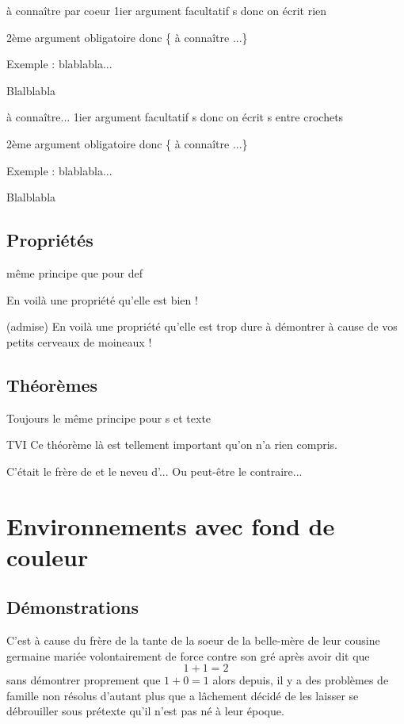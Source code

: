 \documentclass[french,10pt]{book}
\begin{document}
\begin{Defi} {à connaître par coeur}
1ier argument facultatif s donc on écrit rien \par
2ème argument obligatoire donc \{  à connaître ...\}
\end{Defi}

Exemple : blablabla...\par Blalblabla

\begin{Defi}[s]{à connaître...}
1ier argument facultatif s donc on écrit s entre crochets \par
2ème argument obligatoire donc \{  à connaître ...\}
\end{Defi}
Exemple : blablabla...\par Blalblabla

\subsection{Propriétés}

même principe que pour def \par 
\begin{Prop}[s] {}
    En voilà une propriété qu'elle est bien !
\end{Prop}

\begin{Prop}[]{(admise)}
    En voilà une propriété qu'elle est trop dure à démontrer à cause de vos petits cerveaux de moineaux !
\end{Prop}

\subsection{Théorèmes}
Toujours le même principe pour s et texte\par 
\begin{Thm}{TVI}
    Ce théorème là est tellement important qu'on n'a rien compris.
\end{Thm}

\begin{Thm}[s]{}
    C'était le frère de  et le neveu d'... Ou peut-être le contraire...
\end{Thm}

\section{Environnements avec fond de couleur}
\subsection{Démonstrations}
\begin{Demo}
    C'est à cause du frère de la tante de la s{oe}ur de la belle-mère de leur cousine germaine mariée volontairement de force contre son gré après avoir dit que \[1 + 1 = 2\] sans démontrer proprement que $1 + 0 = 1$ alors depuis, il y a des problèmes de famille non résolus d'autant plus que  a lâchement décidé de les laisser se débrouiller sous prétexte qu'il n'est pas né à leur époque.
\end{Demo}
\end{document}
